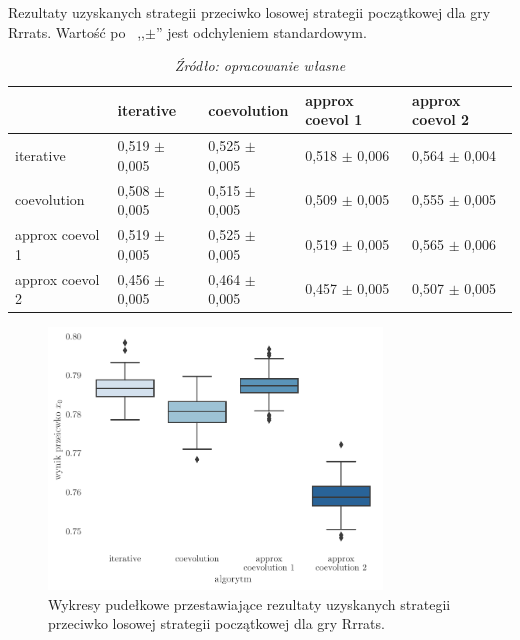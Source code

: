 \documentclass[inzynierska]{pwr_wmat_praca_dyplomowa}
\theoremstyle{plain}
\numberwithin{theorem}{chapter}
\theoremstyle{definition}
\numberwithin{theorem}{chapter}
\begin{document}
	\begin{table}
		\begin{center}
		\caption{Rezultaty uzyskanych strategii przeciwko losowej strategii początkowej dla gry Rrrats. Wartość po  ,,$\pm$'' jest odchyleniem standardowym.}
		\small
		\begin{tabular}{lllll}
			\hline
			\toprule
			{} &        iterative &      coevolution &    approx coevol 1&  approx coevol 2 \\
			\midrule
			iterative       &  0,519 $\pm$ 0,005 &  0,525 $\pm$ 0,005 &  0,518 $\pm$ 0,006 &  0,564 $\pm$ 0,004 \\
			coevolution     &  0,508 $\pm$ 0,005 &  0,515 $\pm$ 0,005 &  0,509 $\pm$ 0,005 &  0,555 $\pm$ 0,005 \\
			approx coevol 1  &  0,519 $\pm$ 0,005 &  0,525 $\pm$ 0,005 &  0,519 $\pm$ 0,005 &  0,565 $\pm$ 0,006 \\
			approx coevol 2 &  0,456 $\pm$ 0,005 &  0,464 $\pm$ 0,005 &  0,457 $\pm$ 0,005 &  0,507 $\pm$ 0,005 \\
			\bottomrule
			\hline
		\end{tabular}
		\caption*{\textit{Źródło: opracowanie własne}}
		\label{table:rrrats_results_all}
	\end{center}
\end{table}

	\begin{figure}
		\centering
		\includegraphics[width=0.79\textwidth]{imagens/rrrats_results.pdf}
		\caption{Wykresy pudełkowe przestawiające rezultaty uzyskanych strategii przeciwko losowej strategii początkowej dla gry Rrrats.}
		\label{fig:rrrats_results}
	\end{figure}

	\newpage
\end{document}
